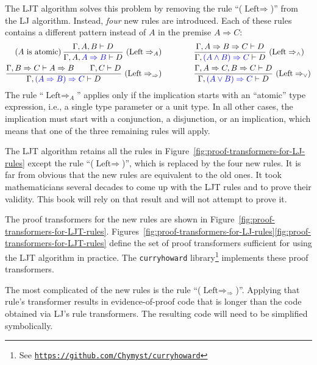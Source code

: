 The LJT algorithm solves this problem by removing the rule \textsf{``}($\text{Left}\Rightarrow$)\textsf{''}
from the LJ algorithm. Instead, \emph{four} new rules are introduced.
Each of these rules contains a different pattern instead of $A$ in
the premise $A\Rightarrow C$:
\begin{align*}
\text{(}A\text{ is atomic)\,}\frac{\Gamma,A,B\vdash D}{\Gamma,A,{\color{blue}A\Rightarrow B}\vdash D}~(\text{Left}\Rightarrow_{A})\qquad & \qquad\frac{\Gamma,A\Rightarrow B\Rightarrow C\vdash D}{\Gamma,{\color{blue}(A\wedge B)\Rightarrow C}\vdash D}~(\text{Left}\Rightarrow_{\wedge})\\
\frac{\Gamma,B\Rightarrow C\vdash A\Rightarrow B\quad\quad\Gamma,C\vdash D}{\Gamma,{\color{blue}(A\Rightarrow B)\Rightarrow C}\vdash D}~(\text{Left}\Rightarrow_{\Rightarrow})\qquad & \qquad\frac{\Gamma,A\Rightarrow C,B\Rightarrow C\vdash D}{\Gamma,{\color{blue}(A\vee B)\Rightarrow C}\vdash D}~(\text{Left}\Rightarrow_{\vee})
\end{align*}
The rule \textsf{``}$\text{Left}\Rightarrow_{A}$\textsf{''} applies only if the implication
starts with an \textsf{``}atomic\textsf{''} type expression, i.e., a single type parameter
or a unit type. In all other cases, the implication must start with
a conjunction, a disjunction, or an implication, which means that
one of the three remaining rules will apply.

The LJT algorithm retains all the rules in Figure~\ref{fig:proof-transformers-for-LJ-rules}
except the rule \textsf{``}($\text{Left}\Rightarrow$)\textsf{''}, which is replaced
by the four new rules. It is far from obvious that the new rules are
equivalent to the old ones. It took mathematicians several decades
to come up with the LJT rules and to prove their validity. This book
will rely on that result and will not attempt to prove it.

The proof transformers for the new rules are shown in Figure~\ref{fig:proof-transformers-for-LJT-rules}.
Figures~\ref{fig:proof-transformers-for-LJ-rules}\textendash \ref{fig:proof-transformers-for-LJT-rules}
define the set of proof transformers sufficient for using the LJT
algorithm in practice. The \lstinline!curryhoward!
library\texttt{}\footnote{See \texttt{\href{https://github.com/Chymyst/curryhoward}{https://github.com/Chymyst/curryhoward}}}
implements these proof transformers.

The most complicated of the new rules is the rule \textsf{``}($\text{Left}\Rightarrow_{\Rightarrow}$)\textsf{''}.
Applying that rule\textsf{'}s transformer results in evidence-of-proof code
that is longer than the code obtained via LJ\textsf{'}s rule transformers.
The resulting code will need to be simplified symbolically. 

